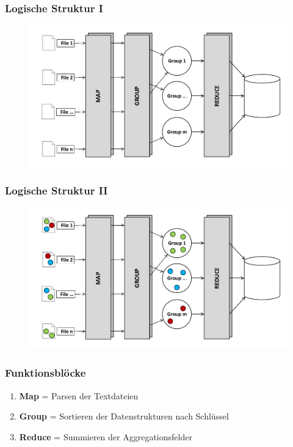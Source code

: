 \documentclass[presentation, shownotes]{beamer}
\begin{document}
\begin{frame}
\frametitle{Logische Struktur I}
\begin{figure}
\centering
\includegraphics[height=.7\textheight]{mapred.pdf}
\end{figure}
\end{frame}

\begin{frame}
\frametitle{Logische Struktur II}
\begin{figure}
\centering
\includegraphics[height=.7\textheight]{mapred_groups.pdf}
\end{figure}
\end{frame}


\begin{frame}
\frametitle{Funktionsblöcke}
    \begin{enumerate}
    \setlength\itemsep{1em}
    \item \textbf{Map}    = Parsen der Textdateien
    \item \textbf{Group}  = Sortieren der Datenstrukturen nach Schlüssel
    \item \textbf{Reduce} = Summieren der Aggregationsfelder
    \end{enumerate}
\end{frame}
\end{document}
